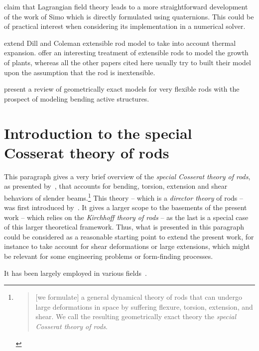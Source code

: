  claim that Lagrangian field theory leads to a more straightforward development of the work of Simo \cite{Simo1991} which is directly formulated using quaternions. This could be of practical interest when considering its implementation in a numerical solver.

 extend Dill and Coleman extensible rod model to take into account thermal expansion.  offer an interesting treatment of extensible rods to model the growth of plants, whereas all the other papers cited here usually try to built their model upon the assumption that the rod is inextensible.

 present a review of geometrically exact models for very flexible rods with the prospect of modeling bending active structures.


\section{Introduction to the special Cosserat theory of rods}\label{sec=cosserat_theory}

This paragraph gives a very brief overview of the \emph{special Cosserat theory of rods}, as presented by~, that accounts for bending, torsion, extension and shear  behaviors of slender beams.\footnote{\blockcquote[p.~270]{Antman2005}{[we formulate] a general dynamical theory of rods that can undergo large deformations in space by suffering flexure, torsion, extension, and shear. We call the resulting geometrically exact theory the \emph{special Cosserat theory of rods}.}} This theory -- which is a \emph{director theory} of rods -- was first introduced by~. It gives a larger scope to the basements of the present work -- which relies on the \emph{Kirchhoff theory of rods} -- as the last is a special case of this larger theoretical framework. Thus, what is presented in this paragraph could be considered as a reasonable starting point to extend the present work, for instance to take account for shear deformations or large extensions, which might be relevant for some engineering problems or form-finding processes.

It has been largely employed in various fields~\cite{Shi1995, Bergou2010}.


